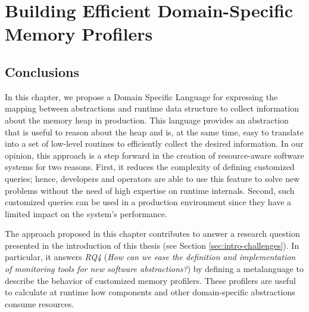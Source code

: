 \chapter{Building Efficient Domain-Specific Memory Profilers}
\label{chp:dsl-memory}














\section{Conclusions}\label{sec:conclusions}

In this chapter, we propose a Domain Specific Language for expressing the mapping between abstractions and runtime data structure to collect information about the memory heap in production.
This language provides an abstraction that is useful to reason about the heap and is, at the same time, easy to translate into a set of low-level routines to efficiently collect the desired information.
In our opinion, this approach is a step forward in the creation of resource-aware software systems for two reasons. 
First, it reduces the complexity of defining customized queries; hence, developers and operators are able to use this feature to solve new problems without the need of high expertise on runtime internals.
Second, such customized queries can be used in a production environment since they have a limited impact on the system's performance.

The approach proposed in this chapter contributes to answer a research question presented in the introduction of this thesis (see Section \ref{sec:intro-challenges}).
In particular, it answers \textit{RQ4} (\textit{How can we ease the definition and implementation of monitoring tools for new software abstractions?}) by defining a metalanguage to describe the behavior of customized memory profilers.
These profilers are useful to calculate at runtime how components and other domain-specific abstractions consume resources. 

